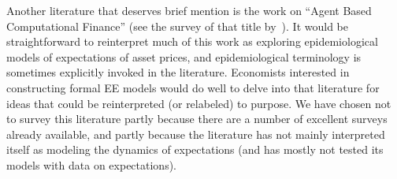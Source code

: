 Another literature that deserves brief mention is the work on ``Agent Based Computational Finance'' (see the survey of that title by~\cite{lebaronAgentCompFinance}).  It would be straightforward to reinterpret much of this work as exploring epidemiological models of expectations of asset prices, and epidemiological terminology is sometimes explicitly invoked in the literature.  Economists interested in constructing formal EE models would do well to delve into that literature for ideas that could be reinterpreted (or relabeled) to purpose.  We have chosen not to survey this literature partly because there are a number of excellent surveys already available, and partly because the literature has not mainly interpreted itself as modeling the dynamics of expectations (and has mostly not tested its models with data on expectations).